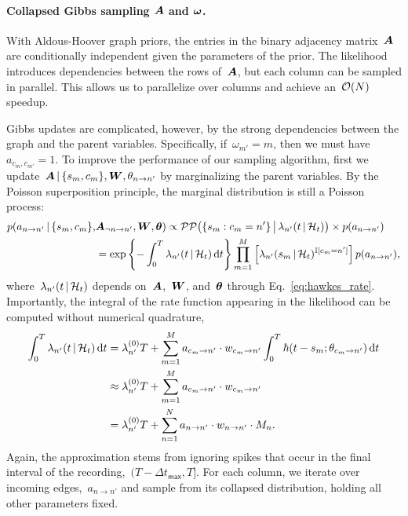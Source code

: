 \paragraph{Collapsed Gibbs sampling $\boldsymbol{A}$ and $\boldsymbol{\omega}$.}
With Aldous-Hoover graph priors, the entries in the binary adjacency
matrix~$\boldsymbol{A}$ are conditionally independent given the parameters of the
prior. The likelihood introduces dependencies between the rows
of~$\boldsymbol{A}$, but each column can be sampled in parallel.
This
allows us to parallelize over columns and achieve an~$\mathcal{O}(N)$
speedup.

Gibbs updates
are complicated, however, by the strong dependencies between the graph and the
parent variables. Specifically, if~${\omega_{m'}=m}$, then
we must have~${a_{c_{m},c_{m'}}=1}$. To improve the performance of our
sampling algorithm, first we
update~${\boldsymbol{A}\,|\,\{s_m,c_m\},\boldsymbol{W},\theta_{n \to n'}}$ by marginalizing
the parent variables. By the Poisson superposition principle, the marginal
distribution is still a Poisson process:
\begin{align*}
  p(a_{n \to n'} \,|\, \{s_m, c_m\}, &\boldsymbol{A}_{\neg n \to n'}, \boldsymbol{W}, \boldsymbol{\theta}) 
  \propto \mathcal{PP} \big(\{s_m: c_m=n'\} \, \big| \, \lambda_{n'}(t \,|\, \mathcal{H}_t)\big)
  \times p(a_{n \to n'}) \\
  &= \exp \left \{ -\int_0^T \lambda_{n'}(t \,|\, \mathcal{H}_t) \, \mathrm{d}t \right\}
  \prod_{m=1}^M \left[ \lambda_{n'}(s_m \,|\, \mathcal{H}_t)^{\mathbb{I}[c_m=n']} \right]
  p(a_{n \to n'}),
\end{align*}
where~$\lambda_{n'}(t \,|\, \mathcal{H}_t)$ depends on~$\boldsymbol{A}$,~$\boldsymbol{W}$, and~$\boldsymbol{\theta}$
through Eq.~\ref{eq:hawkes_rate}.
Importantly, the integral of the rate function appearing in the
likelihood can be computed without numerical quadrature,
\begin{align*}
  \int_0^T \lambda_{n'}(t \,|\, \mathcal{H}_t) \, \mathrm{d}t
  &= \lambda^{(0)}_{n'} T +
  \sum_{m=1}^M a_{c_m \to n'} \cdot w_{c_m \to n'}
  \int_0^T  \hbar(t-s_m; \theta_{c_m \to n'}) \, \mathrm{d}t \\
  &\approx \lambda^{(0)}_{n'} T + \sum_{m=1}^M a_{c_m \to n'} \cdot w_{c_m \to n'} \\
  &= \lambda^{(0)}_{n'} T + \sum_{n=1}^N a_{n \to n'} \cdot w_{n \to n'} \cdot M_{n}.
\end{align*}
Again, the approximation stems from ignoring spikes that occur in the
final interval of the recording,~${(T-\Delta t_{\mathsf{max}}, T]}$.
  For each column, we iterate over incoming edges,~$a_{n \to n'}$ and
  sample from its collapsed distribution, holding all other parameters
  fixed.

